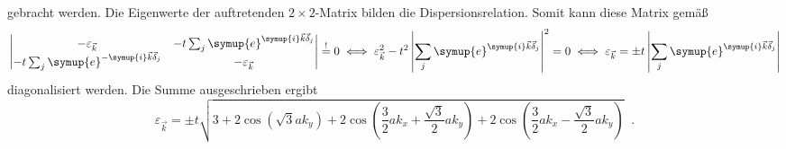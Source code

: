 gebracht werden.
Die Eigenwerte der auftretenden $2 \times 2$-Matrix bilden die Dispersionsrelation.
Somit kann diese Matrix gemäß
\begin{equation*}
    \begin{vmatrix}
        -\varepsilon_{\vec{k}} & -t\sum_{j} \symup{e}^{\symup{i}\vec{k}\vec{\delta}_j}     \\
        -t\sum_{j} \symup{e}^{-\symup{i}\vec{k}\vec{\delta}_j} & -\varepsilon_{\vec{k}}     
    \end{vmatrix} \stackrel{!}{=} 0 
    \iff \varepsilon_{\vec{k}}^2 - t^2 \left | \sum_{j} \symup{e}^{\symup{i}\vec{k}\vec{\delta}_j} \right |^2 = 0 
    \iff \varepsilon_{\vec{k}} = \pm t \left | \sum_{j} \symup{e}^{\symup{i}\vec{k}\vec{\delta}_j} \right |
\end{equation*}
diagonalisiert werden.
Die Summe ausgeschrieben ergibt
\begin{equation*}
    \varepsilon_{\vec{k}} = \pm t \sqrt{3+2 \cos \left ( \sqrt{3}ak_y \right )+2\cos \left ( \frac{3}{2}ak_x+\frac{\sqrt{3}}{2}ak_y \right ) + 2\cos \left ( \frac{3}{2}ak_x-\frac{\sqrt{3}}{2}ak_y \right ) } \; \; .
    \label{eqn:dispersion_graphene_calc}
\end{equation*}
